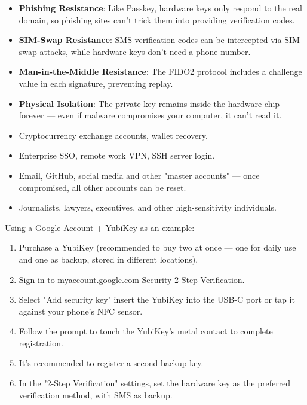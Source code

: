 
\begin{itemize}
  \item \textbf{Phishing Resistance}: Like Passkey, hardware keys only respond to the real domain, so phishing sites can't trick them into providing verification codes.
  \item \textbf{SIM-Swap Resistance}: SMS verification codes can be intercepted via SIM-swap attacks, while hardware keys don't need a phone number.
  \item \textbf{Man-in-the-Middle Resistance}: The FIDO2 protocol includes a challenge value in each signature, preventing replay.
  \item \textbf{Physical Isolation}: The private key remains inside the hardware chip forever — even if malware compromises your computer, it can't read it.
\end{itemize}


\begin{itemize}
  \item Cryptocurrency exchange accounts, wallet recovery.
  \item Enterprise SSO, remote work VPN, SSH server login.
  \item Email, GitHub, social media and other "master accounts" — once compromised, all other accounts can be reset.
  \item Journalists, lawyers, executives, and other high-sensitivity individuals.
\end{itemize}


Using a Google Account + YubiKey as an example:

\begin{enumerate}
  \item Purchase a YubiKey (recommended to buy two at once — one for daily use and one as backup, stored in different locations).
  \item Sign in to myaccount.google.com Security 2-Step Verification.
  \item Select "Add security key" insert the YubiKey into the USB-C port or tap it against your phone's NFC sensor.
  \item Follow the prompt to touch the YubiKey's metal contact to complete registration.
  \item It's recommended to register a second backup key.
  \item In the "2-Step Verification" settings, set the hardware key as the preferred verification method, with SMS as backup.
\end{enumerate}

